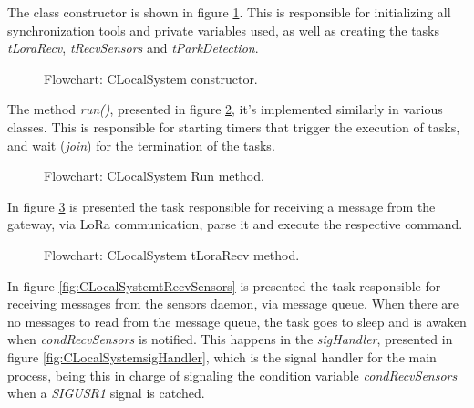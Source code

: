 
The class constructor is shown in figure \ref{fig:CLocalSystemConstructor}. This is responsible for initializing all synchronization tools and private variables used, as well as creating the tasks \textit{tLoraRecv}, \textit{tRecvSensors} and \textit{tParkDetection}.

\begin{figure}[H]
	\centering
	\caption{Flowchart: CLocalSystem constructor.}
	\label{fig:CLocalSystemConstructor}
\end{figure}

The method \textit{run()}, presented in figure \ref{fig:CLocalSystemRun}, it's implemented similarly in various classes. This is responsible for starting timers that trigger the execution of tasks, and wait (\textit{join}) for the termination of the tasks.

\begin{figure}[H]
	\centering
	\caption{Flowchart: CLocalSystem Run method.}
	\label{fig:CLocalSystemRun}
\end{figure}

In figure \ref{fig:CLocalSystemtLoraRecv} is presented the task responsible for receiving a message from the gateway, via LoRa communication, parse it and execute the respective command.

\begin{figure}[H]
	\centering
	\caption{Flowchart: CLocalSystem tLoraRecv method.}
	\label{fig:CLocalSystemtLoraRecv}
\end{figure}

In figure \ref{fig:CLocalSystemtRecvSensors} is presented the task responsible for receiving messages from the sensors daemon, via message queue. When there are no messages to read from the message queue, the task goes to sleep and is awaken when \textit{condRecvSensors} is notified. This happens in the \textit{sigHandler}, presented in figure \ref{fig:CLocalSystemsigHandler}, which is the signal handler for the main process, being this in charge of signaling the condition variable \textit{condRecvSensors} when a \textit{SIGUSR1} signal is catched.

